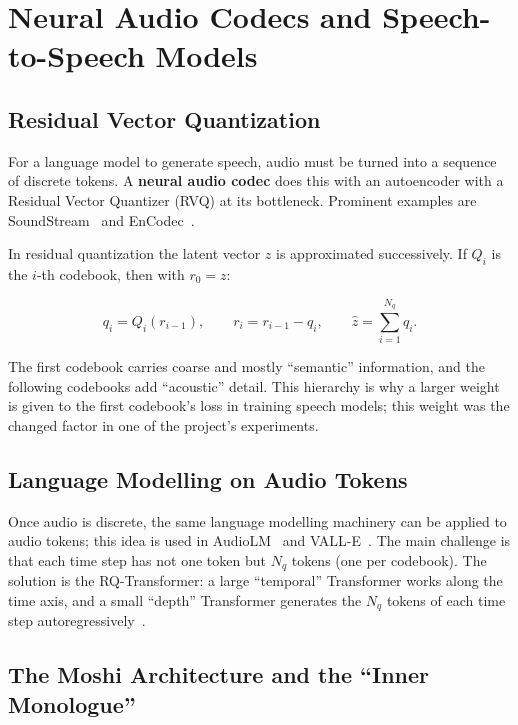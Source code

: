 \section{Neural Audio Codecs and Speech-to-Speech Models}
\label{sec:codec}

\subsection{Residual Vector Quantization}

For a language model to generate speech, audio must be turned into a sequence of
discrete tokens. A \textbf{neural audio codec} does this with an autoencoder with a
Residual Vector Quantizer (RVQ) at its bottleneck. Prominent examples are
SoundStream~\cite{zeghidour2021soundstream} and EnCodec~\cite{defossez2023encodec}.

In residual quantization the latent vector $z$ is approximated successively. If
$Q_i$ is the $i$-th codebook, then with $r_0 = z$:

\begin{equation}
q_i = Q_i(r_{i-1}), \qquad r_i = r_{i-1} - q_i, \qquad
\hat{z} = \sum_{i=1}^{N_q} q_i .
\label{eq:rvq}
\end{equation}

The first codebook carries coarse and mostly ``semantic'' information, and the
following codebooks add ``acoustic'' detail. This hierarchy is why a larger weight
is given to the first codebook's loss in training speech models; this weight was the
changed factor in one of the project's experiments.

\subsection{Language Modelling on Audio Tokens}

Once audio is discrete, the same language modelling machinery can be applied to
audio tokens; this idea is used in AudioLM~\cite{borsos2023audiolm} and
VALL-E~\cite{wang2023valle}. The main challenge is that each time step has not one
token but $N_q$ tokens (one per codebook). The solution is the
RQ-Transformer: a large ``temporal'' Transformer works along the time axis, and a
small ``depth'' Transformer generates the $N_q$ tokens of each time step
autoregressively~\cite{lee2022rqvae}.

\subsection{The Moshi Architecture and the ``Inner Monologue''}
\label{sec:moshi-arch}

